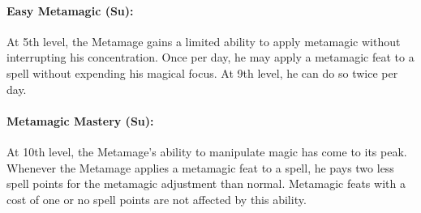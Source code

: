 \paragraph{Easy Metamagic (Su):}
At 5th level, the Metamage gains a limited ability to apply metamagic without interrupting his concentration.
Once per day, he may apply a metamagic feat to a spell without expending his magical focus.
At 9th level, he can do so twice per day.

\paragraph{Metamagic Mastery (Su):}
At 10th level, the Metamage's ability to manipulate magic has come to its peak.
Whenever the Metamage applies a metamagic feat to a spell, he pays two less spell points for the metamagic adjustment than normal.
Metamagic feats with a cost of one or no spell points are not affected by this ability.